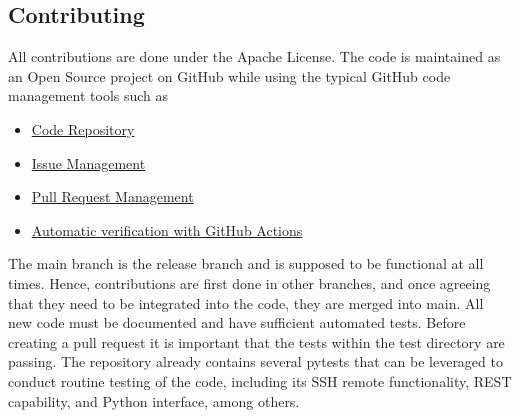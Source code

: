
\subsection{Contributing}\label{contributing}

All contributions are done under the Apache License.  The code is
maintained as an Open Source project on GitHub while using the typical
GitHub code management tools such as

\begin{itemize}
\item
  \href{https://github.com/cloudmesh/cloudmesh-cc}{Code Repository}
\item
  \href{https://github.com/cloudmesh/cloudmesh-cc/issues}{Issue Management}
\item
  \href{https://github.com/cloudmesh/cloudmesh-cc/pulls}{Pull Request Management}
\item
  \href{https://github.com/cloudmesh/cloudmesh-cc/actions}{Automatic verification with GitHub Actions}
\end{itemize}

The main branch is the release branch and is supposed to be functional
at all times. Hence, contributions are first done in other branches,
and once agreeing that they need to be integrated into the code, they
are merged into main. All new code must be documented and have
sufficient automated tests.  Before creating a pull request it is
important that the tests within the test directory are passing.  The
repository already contains several pytests that can be leveraged to
conduct routine testing of the code, including its SSH remote
functionality, REST capability, and Python interface, among others.
